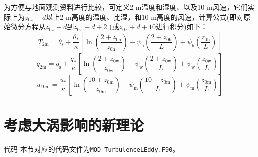 为方便与地面观测资料进行比较，可定义2 m温度和湿度、以及10 m风速，它们实际上为$z_{0x}+d$以上2 m高度的温度、比湿，和10 m高度的风速，计算公式(即对原始微分方程从$z_{0x}+d$到$z_{0x}+d+2$ (或$z_{0x}+d+10$进行积分)如下：
  \begin{equation}\label{T2m}
    T_{\mathrm{2 m}}=\theta_{\mathrm{s}}+\frac{\theta_{*}}{\kappa}\left[\ln \left(\frac{2+z_{\mathrm{0 h}}}{z_{\mathrm{0 h}}}\right)-\psi_{\mathrm{h}}\left(\frac{2+z_{\mathrm{0 h}}}{L}\right)+\psi_{\mathrm{h}}\left(\frac{z_{\mathrm{0 h}}}{L}\right)\right]
  \end{equation}
  \begin{equation}\label{q2m}
    q_{\mathrm{2 m}}=q_{\mathrm{s}}+\frac{q_{*}}{\kappa}\left[\ln \left(\frac{2+z_{\mathrm{0 w}}}{z_{\mathrm{0 w}}}\right)-\psi_{\mathrm{w}}\left(\frac{2+z_{\mathrm{0 w}}}{L}\right)+\psi_{\mathrm{w}}\left(\frac{z_{\mathrm{0 w}}}{L}\right)\right]
  \end{equation}
  \begin{equation}\label{u10m}
    u_{\mathrm{10 m}}=\frac{u_{*}}{\kappa}\left[\ln \left(\frac{10+z_{\mathrm{0 m}}}{z_{\mathrm{0 m}}}\right)-\psi_{\mathrm{m}}\left(\frac{10+z_{\mathrm{0 m}}}{L}\right)+\psi_{\mathrm{m}}\left(\frac{z_{\mathrm{0 m}}}{L}\right)\right]
  \end{equation}


\section{考虑大涡影响的新理论}\label{考虑大涡影响的新理论}
\begin{mymdframed}{代码}
本节对应的代码文件为\texttt{MOD\_TurbulenceLEddy.F90}。
\end{mymdframed}

